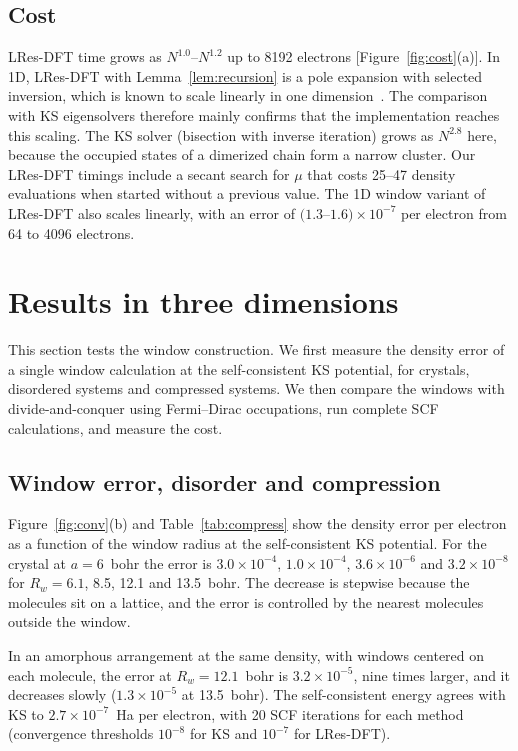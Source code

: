 \documentclass[aps,prb,twocolumn,superscriptaddress,floatfix,longbibliography]{revtex4-2}
\theoremstyle{remark}
\begin{document}
\subsection{Cost}

LRes-DFT time grows as $N^{1.0}$--$N^{1.2}$ up to 8192 electrons [Figure~\ref{fig:cost}(a)]. In 1D, LRes-DFT with
Lemma~\ref{lem:recursion} is a pole expansion with selected inversion, which is known to scale linearly in one
dimension~\cite{PEXSI2013}. The comparison with KS eigensolvers therefore mainly confirms that the implementation reaches
this scaling. The KS solver (bisection with inverse iteration) grows as $N^{2.8}$ here, because the occupied states of a dimerized
chain form a narrow cluster. Our LRes-DFT timings include a secant search for $\mu$ that costs 25--47 density evaluations
when started without a previous value. The 1D window variant of LRes-DFT also scales linearly, with an error of
$(1.3$--$1.6)\times10^{-7}$ per electron from 64 to 4096 electrons.

\section{Results in three dimensions}\label{sec:res3d}

This section tests the window construction. We first measure the density error of a single window calculation at the
self-consistent KS potential, for crystals, disordered systems and compressed systems. We then compare the windows with
divide-and-conquer using Fermi--Dirac occupations, run complete SCF calculations, and measure the cost.

\subsection{Window error, disorder and compression}

Figure~\ref{fig:conv}(b) and Table~\ref{tab:compress} show the density error per electron as a function of the window
radius at the self-consistent KS potential. For the crystal at $a=6$~bohr the error is $3.0\times10^{-4}$, $1.0\times10^{-4}$,
$3.6\times10^{-6}$ and $3.2\times10^{-8}$ for $R_w=6.1$, 8.5, 12.1 and 13.5~bohr. The decrease is stepwise because the
molecules sit on a lattice, and the error is controlled by the nearest molecules outside the window.

In an amorphous arrangement at the same density, with windows centered on each molecule, the error at $R_w=12.1$~bohr is
$3.2\times10^{-5}$, nine times larger, and it decreases slowly ($1.3\times10^{-5}$ at 13.5~bohr). The self-consistent
energy agrees with KS to $2.7\times10^{-7}$~Ha per electron, with 20 SCF iterations for each method (convergence thresholds
$10^{-8}$ for KS and $10^{-7}$ for LRes-DFT).
\end{document}
